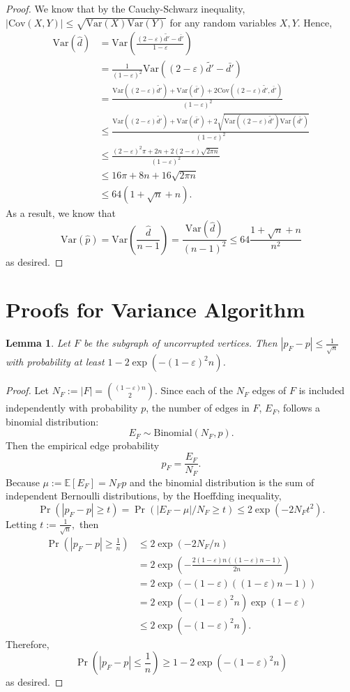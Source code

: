 \documentclass[10pt,onecolumn,letterpaper]{article}
\newtheorem{lem}[thm]{Lemma}
\newcommand{\ee}{\mathbb{E}}
\newcommand{\Var}{\mathrm{Var}}
\newcommand{\eps}{\varepsilon}
\let\epsilon\varepsilon
\begin{document}
\begin{proof}
We know that by the Cauchy-Schwarz inequality, $|\mathrm{Cov}(X, Y)| \leq \sqrt{\Var(X)\Var(Y)}$ for any random variables $X, Y$. Hence, \begin{align*}
    \Var(\hat d) &= \Var\left(\frac{(2-\eps)\tilde{d'} - \bar{d'}}{1-\eps}\right)\\
    &= \frac{1}{(1-\eps)^2}\Var\left((2-\eps)\tilde{d'} - \bar{d'}\right)\\
    &= \frac{\Var((2-\eps)\tilde{d'}) + \Var(\bar{d'}) + 2\mathrm{Cov}((2-\eps)\tilde{d'}, \bar{d'})}{(1-\eps)^2}\\
    &\leq \frac{\Var((2-\eps)\tilde{d'}) + \Var(\bar{d'}) + 2\sqrt{\Var((2-\eps)\tilde{d'}) \Var(\bar{d'})}}{(1-\eps)^2}\\
    &\leq \frac{(2-\eps)^2\pi + 2n + 2(2-\eps)\sqrt{2\pi n}}{(1-\eps)^2}\\
    &\leq 16\pi + 8n + 16\sqrt{2\pi n}\\
    &\leq 64(1 + \sqrt{n} + n).
\end{align*} As a result, we know that $$\Var(\hat p) = \Var\left(\frac{\hat d}{n-1}\right) = \frac{\Var(\hat d)}{(n-1)^2} \leq 64\frac{1 + \sqrt{n} + n}{n^2}$$ as desired.
\end{proof}

\section{Proofs for Variance Algorithm}\label{proofs for variance algorithm}
\begin{lem}
\label{lemma: p_F - p}
Let $F$ be the subgraph of uncorrupted vertices. Then $|p_F - p| \leq \frac{1}{\sqrt{n}}$ with probability at least $1- 2\exp{\left(-(1-\epsilon)^2n\right)}$.
\end{lem}

\begin{proof}
Let $N_F := |F| = {(1-\epsilon)n\choose 2}$. Since each of the $N_F$ edges of $F$ is included independently with probability $p$, the number of edges in $F$, $E_F$, follows a binomial distribution: $$E_F\sim\mathrm{Binomial}(N_F, p).$$ Then the empirical edge probability $$p_F = \frac{E_F}{N_F}.$$ Because $\mu:= \ee[E_F] = N_Fp$ and the binomial distribution is the sum of independent Bernoulli distributions, by the Hoeffding inequality, $$\Pr(|p_F - p| \geq t) = \Pr(|E_F - \mu|/N_F \geq t)\leq2\exp(-2N_Ft^2).$$ Letting $t := \frac{1}{\sqrt{n}},$ then \begin{align*}
    \Pr\left(|p_F - p| \geq \frac{1}{n}\right) &\leq 2\exp(-2N_F/n)\\
    &= 2\exp\left(-\frac{2(1-\epsilon)n((1-\epsilon)n - 1)}{2n}\right)\\
    &= 2\exp(-(1-\epsilon)((1-\epsilon)n - 1))\\
    &= 2\exp(-(1-\epsilon)^2n)\exp(1-\epsilon)\\
    &\leq 2\exp(-(1-\epsilon)^2n).
\end{align*} Therefore, $$\Pr\left(|p_F - p| \leq \frac{1}{n}\right) \geq 1- 2\exp(-(1-\epsilon)^2n)$$ as desired.
\end{proof}
\end{document}
